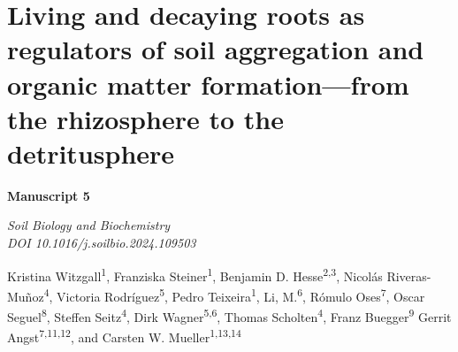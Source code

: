 \chapter{Living and decaying roots as regulators of soil aggregation and organic matter formation---from the rhizosphere to the detritusphere}
\label{chap:manuscript5} %

\begin{center}
    \textbf{\Large Manuscript 5}
  
    \vspace{0.3cm}
    \textit{Soil Biology and Biochemistry}\\
    \textit{DOI 10.1016/j.soilbio.2024.109503}
    
    \vspace{0.5cm}

    Kristina Witzgall\textsuperscript{1}, Franziska Steiner\textsuperscript{1}, Benjamin D. Hesse\textsuperscript{2,3}, Nicolás Riveras-Muñoz\textsuperscript{4}, Victoria Rodríguez\textsuperscript{5}, Pedro Teixeira\textsuperscript{1}, Li, M.\textsuperscript{6}, Rómulo Oses\textsuperscript{7}, Oscar Seguel\textsuperscript{8}, Steffen Seitz\textsuperscript{4}, Dirk Wagner\textsuperscript{5,6}, Thomas Scholten\textsuperscript{4}, Franz Buegger\textsuperscript{9} Gerrit Angst\textsuperscript{7,11,12}, and Carsten W. Mueller\textsuperscript{1,13,14}

    \vspace{0.2cm}
  \end{center}
  
